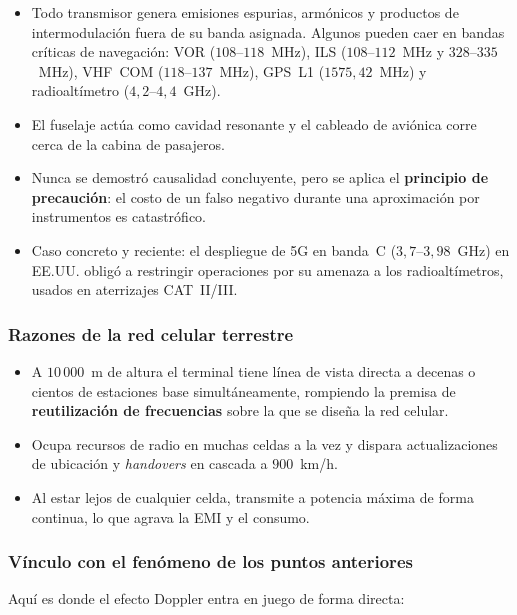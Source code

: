 \documentclass[12pt,a4paper]{article}
\begin{document}
\begin{itemize}
  \item Todo transmisor genera emisiones espurias, armónicos y productos de
        intermodulación fuera de su banda asignada. Algunos pueden caer en bandas
        críticas de navegación: VOR ($108$--$118$~MHz), ILS ($108$--$112$~MHz y
        $328$--$335$~MHz), VHF~COM ($118$--$137$~MHz), GPS~L1 ($1575{,}42$~MHz) y
        radioaltímetro ($4{,}2$--$4{,}4$~GHz).
  \item El fuselaje actúa como cavidad resonante y el cableado de aviónica corre cerca de
        la cabina de pasajeros.
  \item Nunca se demostró causalidad concluyente, pero se aplica el \textbf{principio de
        precaución}: el costo de un falso negativo durante una aproximación por
        instrumentos es catastrófico.
  \item Caso concreto y reciente: el despliegue de 5G en banda~C ($3{,}7$--$3{,}98$~GHz)
        en EE.UU. obligó a restringir operaciones por su amenaza a los radioaltímetros,
        usados en aterrizajes CAT~II/III.
\end{itemize}

\subsubsection*{Razones de la red celular terrestre}

\begin{itemize}
  \item A $10\,000$~m de altura el terminal tiene línea de vista directa a decenas o
        cientos de estaciones base simultáneamente, rompiendo la premisa de
        \textbf{reutilización de frecuencias} sobre la que se diseña la red celular.
  \item Ocupa recursos de radio en muchas celdas a la vez y dispara actualizaciones de
        ubicación y \emph{handovers} en cascada a $900$~km/h.
  \item Al estar lejos de cualquier celda, transmite a potencia máxima de forma continua,
        lo que agrava la EMI y el consumo.
\end{itemize}

\subsubsection*{Vínculo con el fenómeno de los puntos anteriores}

Aquí es donde el efecto Doppler entra en juego de forma directa:
\end{document}
